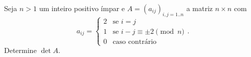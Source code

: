 Seja \( n > 1\) um inteiro positivo ímpar e \( A = (a_{ij})_{i, j = 1..n}\) a matriz \( n \times n\) com
\[ a_{ij}= \begin{cases}2 & \text{se }i = j \\ 1 & \text{se }i-j \equiv \pm 2 \pmod n \\ 0 & \text{caso contrário}\end{cases}.\]
Determine \( \det A\).
